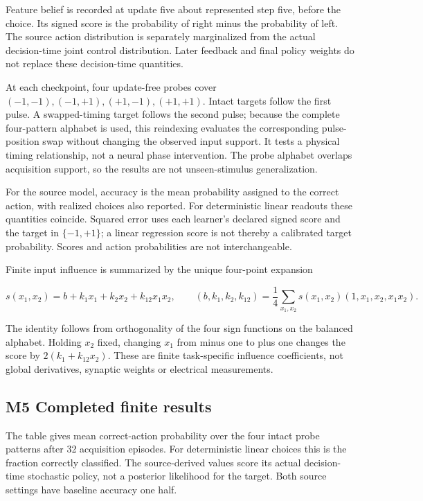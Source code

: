 \documentclass[
  american,
  11pt,
  letterpaper,
]{article}
\begin{document}
Feature belief is recorded at update five about represented step five, before the choice. Its signed score is the probability of right minus the probability of left. The source action distribution is separately marginalized from the actual decision-time joint control distribution. Later feedback and final policy weights do not replace these decision-time quantities.

At each checkpoint, four update-free probes cover \((-1,-1),(-1,+1),(+1,-1),(+1,+1)\). Intact targets follow the first pulse. A swapped-timing target follows the second pulse; because the complete four-pattern alphabet is used, this reindexing evaluates the corresponding pulse-position swap without changing the observed input support. It tests a physical timing relationship, not a neural phase intervention. The probe alphabet overlaps acquisition support, so the results are not unseen-stimulus generalization.

For the source model, accuracy is the mean probability assigned to the correct action, with realized choices also reported. For deterministic linear readouts these quantities coincide. Squared error uses each learner's declared signed score and the target in \(\{-1,+1\}\); a linear regression score is not thereby a calibrated target probability. Scores and action probabilities are not interchangeable.

Finite input influence is summarized by the unique four-point expansion

\begin{equation}
s(x_1,x_2)=b+k_1x_1+k_2x_2+k_{12}x_1x_2,
\qquad
(b,k_1,k_2,k_{12})=\frac14\sum_{x_1,x_2}s(x_1,x_2)(1,x_1,x_2,x_1x_2).
\tag{M3}
\end{equation}

The identity follows from orthogonality of the four sign functions on the balanced alphabet. Holding \(x_2\) fixed, changing \(x_1\) from minus one to plus one changes the score by \(2(k_1+k_{12}x_2)\). These are finite task-specific influence coefficients, not global derivatives, synaptic weights or electrical measurements.

\par\ifdim\dimexpr\pagegoal-\pagetotal\relax<180pt\newpage\fi
\subsection{M5 Completed finite results}\label{m5-completed-finite-results}

The table gives mean correct-action probability over the four intact probe patterns after 32 acquisition episodes. For deterministic linear choices this is the fraction correctly classified. The source-derived values score its actual decision-time stochastic policy, not a posterior likelihood for the target. Both source settings have baseline accuracy one half.
\end{document}
